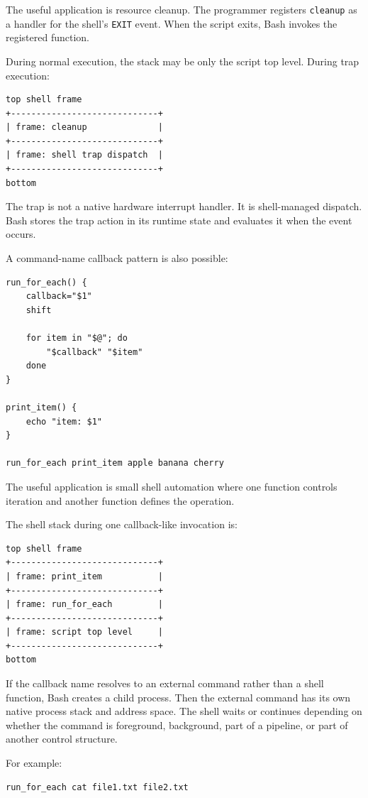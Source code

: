 The useful application is resource cleanup. The programmer registers \texttt{cleanup} as a handler for the shell's \texttt{EXIT} event. When the script exits, Bash invokes the registered function.

During normal execution, the stack may be only the script top level. During trap execution:

\begin{verbatim}
top shell frame
+-----------------------------+
| frame: cleanup              |
+-----------------------------+
| frame: shell trap dispatch  |
+-----------------------------+
bottom
\end{verbatim}

The trap is not a native hardware interrupt handler. It is shell-managed dispatch. Bash stores the trap action in its runtime state and evaluates it when the event occurs.

A command-name callback pattern is also possible:

\begin{verbatim}
run_for_each() {
    callback="$1"
    shift

    for item in "$@"; do
        "$callback" "$item"
    done
}

print_item() {
    echo "item: $1"
}

run_for_each print_item apple banana cherry
\end{verbatim}

The useful application is small shell automation where one function controls iteration and another function defines the operation.

The shell stack during one callback-like invocation is:

\begin{verbatim}
top shell frame
+-----------------------------+
| frame: print_item           |
+-----------------------------+
| frame: run_for_each         |
+-----------------------------+
| frame: script top level     |
+-----------------------------+
bottom
\end{verbatim}

If the callback name resolves to an external command rather than a shell function, Bash creates a child process. Then the external command has its own native process stack and address space. The shell waits or continues depending on whether the command is foreground, background, part of a pipeline, or part of another control structure.

For example:

\begin{verbatim}
run_for_each cat file1.txt file2.txt
\end{verbatim}

